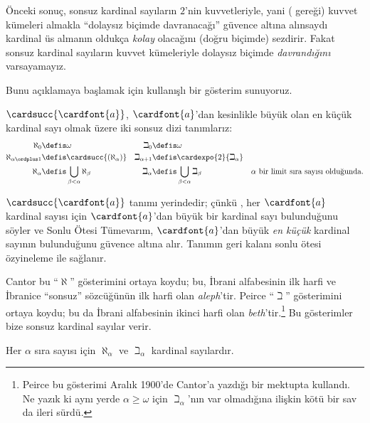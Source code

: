 \documentclass[../../../include/open-logic-section]{subfiles}
\begin{document}


Önceki sonuç, sonsuz kardinal sayıların $2$'nin kuvvetleriyle, yani
( gereği) kuvvet kümeleri almakla
``dolaysız biçimde davranacağı'' güvence altına alınsaydı kardinal üs
almanın oldukça \emph{kolay} olacağını (doğru biçimde) sezdirir. Fakat
sonsuz kardinal sayıların kuvvet kümeleriyle dolaysız biçimde
\emph{davrandığını} varsayamayız.

Bunu açıklamaya başlamak için kullanışlı bir gösterim sunuyoruz.

\begin{defn}
$\cardsucc{\cardfont{a}}$, $\cardfont{a}$'dan kesinlikle büyük olan en
küçük kardinal sayı olmak üzere iki sonsuz dizi tanımlarız:
\begin{align*}
	\aleph_{0} &\defis \omega &
	\beth_{0} &\defis \omega\\
	\aleph_{\alpha \ordplus 1} &\defis \cardsucc{(\aleph_{\alpha})} &
	\beth_{\alpha+1} &\defis \cardexpo{2}{\beth_{\alpha}}\\
	\aleph_{\alpha} &\defis \bigcup_{\beta< \alpha} \aleph_{\beta} &
	\beth_{\alpha} &\defis \bigcup_{\beta < \alpha}\beth_{\beta} &
	\text{$\alpha$ bir limit sıra sayısı olduğunda}.
	\end{align*}
\end{defn}

$\cardsucc{\cardfont{a}}$ tanımı yerindedir; çünkü
, her
$\cardfont{a}$ kardinal sayısı için $\cardfont{a}$'dan büyük bir kardinal
sayı bulunduğunu söyler ve Sonlu Ötesi Tümevarım, $\cardfont{a}$'dan
büyük \emph{en küçük} kardinal sayının bulunduğunu güvence altına alır.
Tanımın geri kalanı sonlu ötesi özyineleme ile sağlanır.

Cantor bu ``$\aleph$'' gösterimini ortaya koydu; bu, İbrani alfabesinin
ilk harfi ve İbranice ``sonsuz'' sözcüğünün ilk harfi olan \emph{aleph}'tir.
Peirce ``$\beth$'' gösterimini ortaya koydu; bu da İbrani alfabesinin
ikinci harfi olan \emph{beth}'tir.\footnote{Peirce bu gösterimi Aralık
1900'de Cantor'a yazdığı bir mektupta kullandı. Ne yazık ki aynı yerde
$\alpha\geq\omega$ için $\beth_\alpha$'nın var olmadığına ilişkin kötü
bir sav da ileri sürdü.} Bu gösterimler bize sonsuz kardinal sayılar verir.

\begin{prop}
Her $\alpha$ sıra sayısı için $\aleph_\alpha$ ve $\beth_\alpha$ kardinal
sayılardır.
\end{prop}
\end{document}
